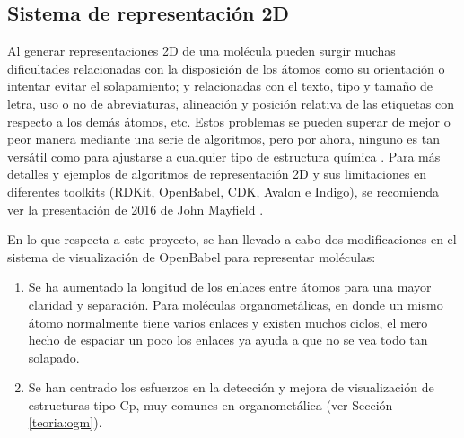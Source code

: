 \subsection{Sistema de representación 2D} \label{implementacion:dibujado}

Al generar representaciones 2D de una molécula pueden surgir muchas dificultades relacionadas con la disposición de los átomos como su orientación o intentar evitar el solapamiento; y relacionadas con el texto, tipo y tamaño de letra, uso o no de abreviaturas, alineación y posición relativa de las etiquetas con respecto a los demás átomos, etc. Estos problemas se pueden superar de mejor o peor manera mediante una serie de algoritmos, pero por ahora, ninguno es tan versátil como para ajustarse a cualquier tipo de estructura química \cite{david_molecular_2020}. Para más detalles y ejemplos de algoritmos de representación 2D y sus limitaciones en diferentes toolkits (RDKit, OpenBabel, CDK, Avalon e Indigo), se recomienda ver la presentación de 2016 de John Mayfield \cite{comparative_depictions}.

En lo que respecta a este proyecto, se han llevado a cabo dos modificaciones en el sistema de visualización de OpenBabel para representar moléculas:
\begin{enumerate}
    \item Se ha aumentado la longitud de los enlaces entre átomos para una mayor claridad y separación. Para moléculas organometálicas, en donde un mismo átomo normalmente tiene varios enlaces y existen muchos ciclos, el mero hecho de espaciar un poco los enlaces ya ayuda a que no se vea todo tan solapado.
    \item Se han centrado los esfuerzos en la detección y mejora de visualización de estructuras tipo Cp, muy comunes en organometálica (ver Sección \ref{teoria:ogm}).
\end{enumerate}


